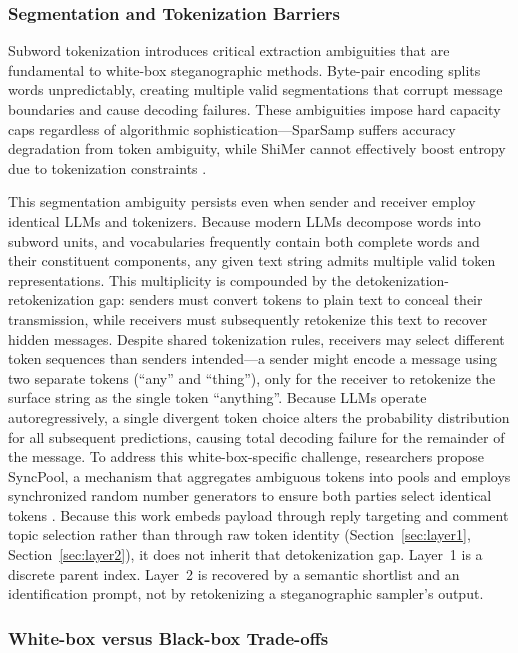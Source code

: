 \subsubsection{Segmentation and Tokenization Barriers}

Subword tokenization introduces critical extraction ambiguities that are fundamental to white-box steganographic methods. Byte-pair encoding splits words unpredictably, creating multiple valid segmentations that corrupt message boundaries and cause decoding failures. These ambiguities impose hard capacity caps regardless of algorithmic sophistication---SparSamp suffers accuracy degradation from token ambiguity, while ShiMer cannot effectively boost entropy due to tokenization constraints \cite{qi2024provably}.

This segmentation ambiguity persists even when sender and receiver employ identical LLMs and tokenizers. Because modern LLMs decompose words into subword units, and vocabularies frequently contain both complete words and their constituent components, any given text string admits multiple valid token representations. This multiplicity is compounded by the detokenization-retokenization gap: senders must convert tokens to plain text to conceal their transmission, while receivers must subsequently retokenize this text to recover hidden messages. Despite shared tokenization rules, receivers may select different token sequences than senders intended---a sender might encode a message using two separate tokens (``any'' and ``thing''), only for the receiver to retokenize the surface string as the single token ``anything''. Because LLMs operate autoregressively, a single divergent token choice alters the probability distribution for all subsequent predictions, causing total decoding failure for the remainder of the message. To address this white-box-specific challenge, researchers propose SyncPool, a mechanism that aggregates ambiguous tokens into pools and employs synchronized random number generators to ensure both parties select identical tokens \cite{qi2024provably}. Because this work embeds payload through reply targeting and comment topic selection rather than through raw token identity (Section~\ref{sec:layer1}, Section~\ref{sec:layer2}), it does not inherit that detokenization gap.
Layer~1 is a discrete parent index.
Layer~2 is recovered by a semantic shortlist and an identification prompt, not by retokenizing a steganographic sampler's output.

\subsubsection{White-box versus Black-box Trade-offs}

